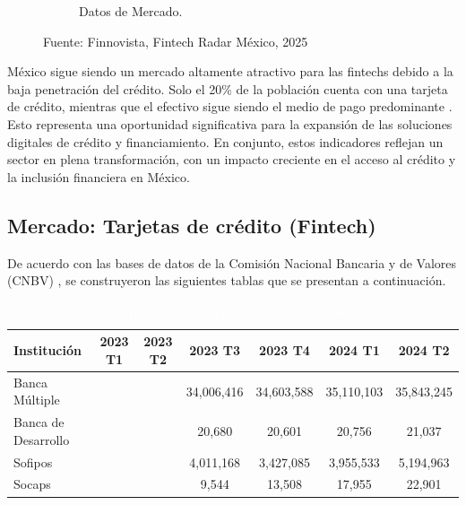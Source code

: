 \begin{figure}[h!]
\begin{subfigure}[b]{0.45\textwidth}
        \caption{Datos de Mercado.}
        \label{fig:datmerca}
    \end{subfigure}
    \caption{Fuente: Finnovista,  Fintech Radar México, 2025}
    \label{fig:figure1}
\end{figure}

México sigue siendo un mercado altamente atractivo para las fintechs debido a la baja penetración del crédito. Solo el 20\% de la población cuenta con una tarjeta de crédito, mientras que el efectivo sigue siendo el medio de pago predominante \cite{elfinanciero2024}. Esto representa una oportunidad significativa para la expansión de las soluciones digitales de crédito y financiamiento. En conjunto, estos indicadores reflejan un sector en plena transformación, con un impacto creciente en el acceso al crédito y la inclusión financiera en México.

\subsection*{Mercado: Tarjetas de crédito (Fintech)}
De acuerdo con las bases de datos de la Comisión Nacional Bancaria y de Valores (CNBV) \cite{cnbv_inclusion_2024}, se construyeron las siguientes tablas que se presentan a continuación.

\begin{table}[h!]
    \centering
    \caption{\textcolor{white}{Número de tarjetas de crédito por tipo de institución (trimestral)}}
    \color{white}
    \begin{tabular}{lcccccc}
        \hline
        \textbf{Institución} & \textbf{2023 T1} & \textbf{2023 T2} & \textbf{2023 T3} & \textbf{2023 T4} & \textbf{2024 T1} & \textbf{2024 T2} \\
        \hline
        Banca Múltiple       &                 &                 &       34,006,416          &       34,603,588          &        35,110,103         &        35,843,245    \\
        Banca de Desarrollo  &                &                 &        20,680         &         20,601        &        20,756         &        21,037        \\
        Sofipos              &                 &                 &        4,011,168         &        3,427,085         &        3,955,533         &        5,194,963      \\
        Socaps               &                 &                 &       9,544          &         13,508        &        17,955         &            22,901     \\
        \hline
    \end{tabular}
    \label{tab:creditos_trimestrales}
\end{table}

